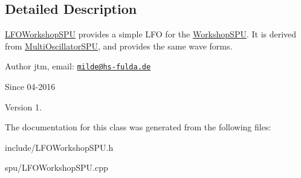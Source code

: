 \subsection{Detailed Description}
\hyperlink{classLFOWorkshopSPU}{L\+F\+O\+Workshop\+S\+PU} provides a simple L\+FO for the \hyperlink{classWorkshopSPU}{Workshop\+S\+PU}. It is derived from \hyperlink{classMultiOscillatorSPU}{Multi\+Oscillator\+S\+PU}, and provides the same wave forms.

\begin{DoxyAuthor}{Author}
jtm, email\+:  \href{mailto:milde@hs-fulda.de}{\tt milde@hs-\/fulda.\+de} 
\end{DoxyAuthor}
\begin{DoxySince}{Since}
04-\/2016 
\end{DoxySince}
\begin{DoxyVersion}{Version}
1. 
\end{DoxyVersion}


The documentation for this class was generated from the following files\+:\begin{DoxyCompactItemize}
\item 
include/L\+F\+O\+Workshop\+S\+P\+U.\+h\item 
spu/L\+F\+O\+Workshop\+S\+P\+U.\+cpp\end{DoxyCompactItemize}
